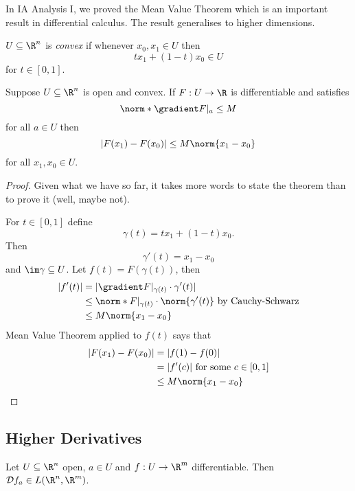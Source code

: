 \documentclass[a4paper]{article}
\newcommand*{\D}{\mathcal{D}}
\theoremstyle{definition}
\begin{document}
In IA Analysis I, we proved the Mean Value Theorem which is an important result in differential calculus. The result generalises to higher dimensions.

\begin{definition}
  \(U \subseteq \R^n\) is \emph{convex} if whenever \(x_0, x_1 \in U\) then
  \[
    tx_1 + (1 - t)x_0 \in U
  \]
  for \(t \in [0, 1]\).
\end{definition}

\begin{theorem}
  Suppose \(U \subseteq \R^n\) is open and convex. If \(F: U \to \R\) is differentiable and satisfies
  \[
    \norm*{\gradient F|_a} \leq M
  \]
  for all \(a \in U\) then
  \[
    |F(x_1) - F(x_0)| \leq M \norm{x_1 - x_0}
  \]
  for all \(x_1, x_0 \in U\).
\end{theorem}

\begin{proof}
  Given what we have so far, it takes more words to state the theorem than to prove it (well, maybe not).
  
  For \(t \in [0, 1]\) define
  \[
    \gamma(t) = t x_1 + (1 - t)x_0.
  \]
  Then
  \[
    \gamma'(t) = x_1 - x_0
  \]
  and \(\im \gamma \subseteq U\). Let \(f(t) = F(\gamma(t))\), then
  \begin{align*}
    |f'(t)| &= |\gradient F|_{\gamma(t)} \cdot \gamma'(t)| \\
            &\leq \norm*{F|_{\gamma(t)}} \cdot \norm{\gamma'(t)} \text{ by Cauchy-Schwarz} \\
            &\leq M \norm{x_1 -x_0}
  \end{align*}
  Mean Value Theorem applied to \(f(t)\) says that
  \begin{align*}
    |F(x_1)  - F(x_0)| &= |f(1) - f(0)| \\
                       &= |f'(c)| \text{ for some } c \in [0, 1] \\
                       &\leq M \norm{x_1 - x_0}
  \end{align*}
\end{proof}

\subsection{Higher Derivatives}

Let \(U \subseteq \R^n\) open, \(a \in U\) and \(f: U \to \R^m\) differentiable. Then \(\D f_a \in L(\R^n, \R^m)\).
\end{document}
